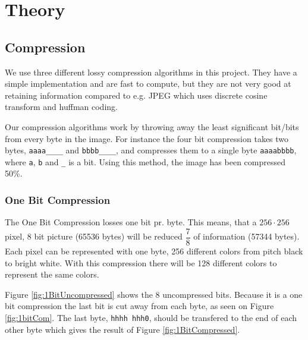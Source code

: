 \section{Theory}

\subsection{Compression}

We use three different lossy compression algorithms in this project.
They have a simple implementation and are fast to compute, but they are not very good at retaining information compared to e.g. JPEG which uses discrete cosine transform and huffman coding.

Our compression algorithms work by throwing away the least significant bit/bits from every byte in the image.
For instance the four bit compression takes two bytes, \texttt{aaaa\_\_\_\_} and \texttt{bbbb\_\_\_\_}, and compresses them to a single byte \texttt{aaaabbbb}, where \texttt{a}, \texttt{b} and \texttt{\_} is a bit. Using this method, the image has been compressed 50\%.


\subsubsection{One Bit Compression} %
\label{sub:one_bit_compression}
\FloatBarrier

The One Bit Compression losses one bit pr. byte.
This means, that a $256 \cdot 256$ pixel, 8 bit picture (65536 bytes) will be reduced $\dfrac{7}{8}$ of information (57344 bytes).
Each pixel can be represented with one byte, 256 different colors from pitch black to bright white.
With this compression there will be 128 different colors to represent the same colors.

Figure \ref{fig:1BitUncompressed} shows the 8 uncompressed bits. 
Because it is a one bit compression the last bit is cut away from each byte, as seen on Figure \ref{fig:1bitCom}.
The last byte, \texttt{hhhh hhh0}, should be transfered to the end of each other byte which gives the result of Figure \ref{fig:1BitCompressed}.


